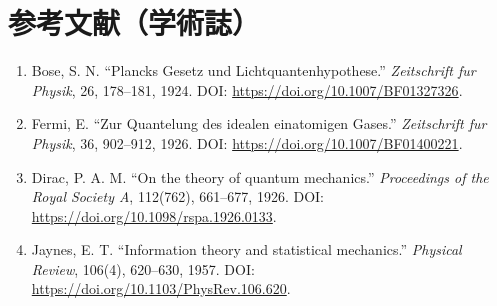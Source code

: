 \section*{参考文献（学術誌）}
\begin{enumerate}[leftmargin=2.4em]
\item Bose, S. N. ``Plancks Gesetz und Lichtquantenhypothese.'' \textit{Zeitschrift fur Physik}, 26, 178--181, 1924. DOI: \url{https://doi.org/10.1007/BF01327326}.
\item Fermi, E. ``Zur Quantelung des idealen einatomigen Gases.'' \textit{Zeitschrift fur Physik}, 36, 902--912, 1926. DOI: \url{https://doi.org/10.1007/BF01400221}.
\item Dirac, P. A. M. ``On the theory of quantum mechanics.'' \textit{Proceedings of the Royal Society A}, 112(762), 661--677, 1926. DOI: \url{https://doi.org/10.1098/rspa.1926.0133}.
\item Jaynes, E. T. ``Information theory and statistical mechanics.'' \textit{Physical Review}, 106(4), 620--630, 1957. DOI: \url{https://doi.org/10.1103/PhysRev.106.620}.
\end{enumerate}
